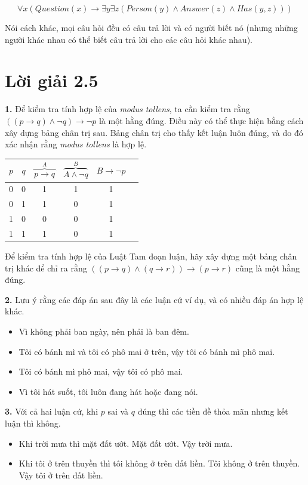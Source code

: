 \documentclass[12pt,a4paper]{article}
\theoremstyle{definition}
\begin{document}
\[\forall x(\textit{Question}(x) \to \exists y \exists z(\textit{Person}(y) \land \textit{Answer}(z) \land \textit{Has}(y, z)))\]

Nói cách khác, mọi câu hỏi đều có câu trả lời và có người biết nó (nhưng những người khác nhau có thể biết câu trả lời cho các câu hỏi khác nhau).

\section*{Lời giải 2.5}

\textbf{1.} Để kiểm tra tính hợp lệ của \textit{modus tollens}, ta cần kiểm tra rằng $((p \to q) \land \neg q) \to \neg p$ là một hằng đúng. Điều này có thể thực hiện bằng cách xây dựng bảng chân trị sau. Bảng chân trị cho thấy kết luận luôn đúng, và do đó xác nhận rằng \textit{modus tollens} là hợp lệ.

\begin{center}
\begin{tabular}{cc|cccc}
$p$ & $q$ & $\overbrace{p \to q}^{A}$ & $\overbrace{A \land \neg q}^{B}$ & $B \to \neg p$ \\
\hline
0 & 0 & 1 & 1 & 1 \\
0 & 1 & 1 & 0 & 1 \\
1 & 0 & 0 & 0 & 1 \\
1 & 1 & 1 & 0 & 1
\end{tabular}
\end{center}

Để kiểm tra tính hợp lệ của Luật Tam đoạn luận, hãy xây dựng một bảng chân trị khác để chỉ ra rằng $((p \to q) \land (q \to r)) \to (p \to r)$ cũng là một hằng đúng.

\medskip
\textbf{2.} Lưu ý rằng các đáp án sau đây là các luận cứ ví dụ, và có nhiều đáp án hợp lệ khác.
\begin{itemize}
\item Vì không phải ban ngày, nên phải là ban đêm.
\item Tôi có bánh mì và tôi có phô mai ở trên, vậy tôi có bánh mì phô mai.
\item Tôi có bánh mì phô mai, vậy tôi có phô mai.
\item Vì tôi hát suốt, tôi luôn đang hát hoặc đang nói.
\end{itemize}

\medskip
\textbf{3.} Với cả hai luận cứ, khi $p$ sai và $q$ đúng thì các tiền đề thỏa mãn nhưng kết luận thì không.
\begin{itemize}
\item Khi trời mưa thì mặt đất ướt. Mặt đất ướt. Vậy trời mưa.
\item Khi tôi ở trên thuyền thì tôi không ở trên đất liền. Tôi không ở trên thuyền. Vậy tôi ở trên đất liền.
\end{itemize}
\end{document}
